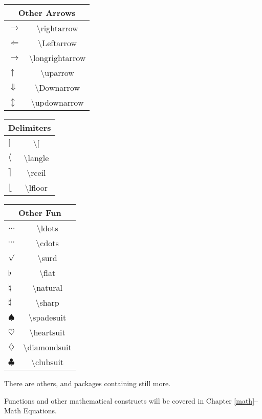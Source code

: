 \begin{multicols}{2}
	\begin{tabular}{|l|c|}
			\hline
		\multicolumn{2}{|c|}{Other Arrows} \\
			\hline
		$\rightarrow$ & \textbackslash{}rightarrow \\
		$\Leftarrow$ & \textbackslash{}Leftarrow \\
		$\longrightarrow$ & \textbackslash{}longrightarrow \\
		$\uparrow$ & \textbackslash{}uparrow \\
		$\Downarrow$ & \textbackslash{}Downarrow \\
		$\updownarrow$ & \textbackslash{}updownarrow \\
			\hline
	\end{tabular}
	\begin{tabular}{|l|c|}
			\hline
		\multicolumn{2}{|c|}{Delimiters} \\
			\hline
		$[$ & \textbackslash{}[ \\
		$\langle$ & \textbackslash{}langle \\
		$\rceil$ & \textbackslash{}rceil \\
		$\lfloor$ & \textbackslash{}lfloor \\
			\hline
	\end{tabular}
	\begin{tabular}{|l|c|}
			\hline
		\multicolumn{2}{|c|}{Other Fun} \\
			\hline
		$\ldots$ & \textbackslash{}ldots \\
		$\cdots$ & \textbackslash{}cdots \\
		$\surd$ & \textbackslash{}surd \\
		$\flat$ & \textbackslash{}flat \\
		$\natural$ & \textbackslash{}natural \\
		$\sharp$ & \textbackslash{}sharp \\
		$\spadesuit$ & \textbackslash{}spadesuit \\
		$\heartsuit$ & \textbackslash{}heartsuit \\
		$\diamondsuit$ & \textbackslash{}diamondsuit \\
		$\clubsuit$ & \textbackslash{}clubsuit \\
			\hline
	\end{tabular}
\end{multicols}


There are others, and packages containing still more.

Functions and other mathematical constructs will be covered in Chapter
\ref{math}--Math Equations.

